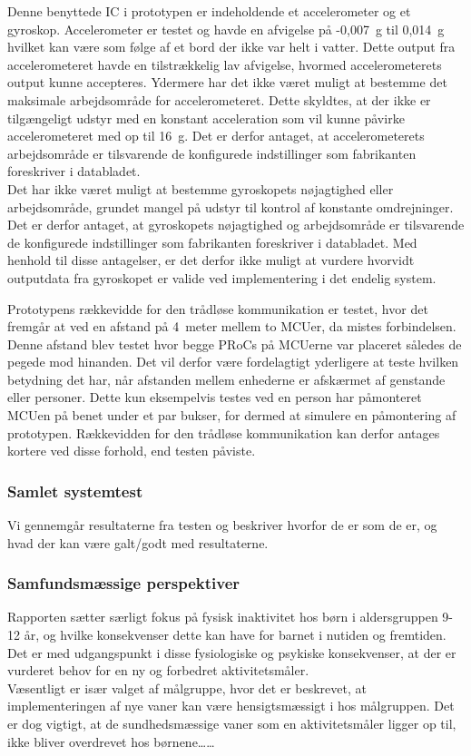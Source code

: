 Denne benyttede IC i prototypen er indeholdende et accelerometer og et gyroskop. Accelerometer er testet og havde en afvigelse på -0,007~g til 0,014~g hvilket kan være som følge af et bord der ikke var helt i vatter. Dette output fra accelerometeret havde en tilstrækkelig lav afvigelse, hvormed accelerometerets output kunne accepteres. Ydermere har det ikke været muligt at bestemme det maksimale arbejdsområde for accelerometeret. Dette skyldtes, at der ikke er tilgængeligt udstyr med en konstant acceleration som vil kunne påvirke accelerometeret med op til 16~g. Det er derfor antaget, at accelerometerets arbejdsområde er tilsvarende de konfigurede indstillinger som fabrikanten foreskriver i databladet. \\
Det har ikke været muligt at bestemme gyroskopets nøjagtighed eller arbejdsområde, grundet mangel på udstyr til kontrol af konstante omdrejninger. Det er derfor antaget, at gyroskopets nøjagtighed og arbejdsområde er tilsvarende de konfigurede indstillinger som fabrikanten foreskriver i databladet. Med henhold til disse antagelser, er det derfor ikke muligt at vurdere hvorvidt outputdata fra gyroskopet er valide ved implementering i det endelig system. 

Prototypens rækkevidde for den trådløse kommunikation er testet, hvor det fremgår at ved en afstand på 4~meter mellem to MCUer, da mistes forbindelsen. Denne afstand blev testet hvor begge PRoCs på MCUerne var placeret således de pegede mod hinanden. Det vil derfor være fordelagtigt yderligere at teste hvilken betydning det har, når afstanden mellem enhederne er afskærmet af genstande eller personer. Dette kun eksempelvis testes ved en person har påmonteret MCUen på benet under et par bukser, for dermed at simulere en påmontering af prototypen. Rækkevidden for den trådløse kommunikation kan derfor antages kortere ved disse forhold, end testen påviste.


\subsubsection{Samlet systemtest}
Vi gennemgår resultaterne fra testen og beskriver hvorfor de er som de er, og hvad der kan være galt/godt med resultaterne.


\subsubsection{Samfundsmæssige perspektiver}
Rapporten sætter særligt fokus på fysisk inaktivitet hos børn i aldersgruppen 9-12 år, og hvilke konsekvenser dette kan have for barnet i nutiden og fremtiden. Det er med udgangspunkt i disse fysiologiske og psykiske konsekvenser, at der er vurderet behov for en ny og forbedret aktivitetsmåler. \\
Væsentligt er især valget af målgruppe, hvor det er beskrevet, at implementeringen af nye vaner kan være hensigtsmæssigt i hos målgruppen. Det er dog vigtigt, at de sundhedsmæssige vaner som en aktivitetsmåler ligger op til, ikke bliver overdrevet hos børnene……
